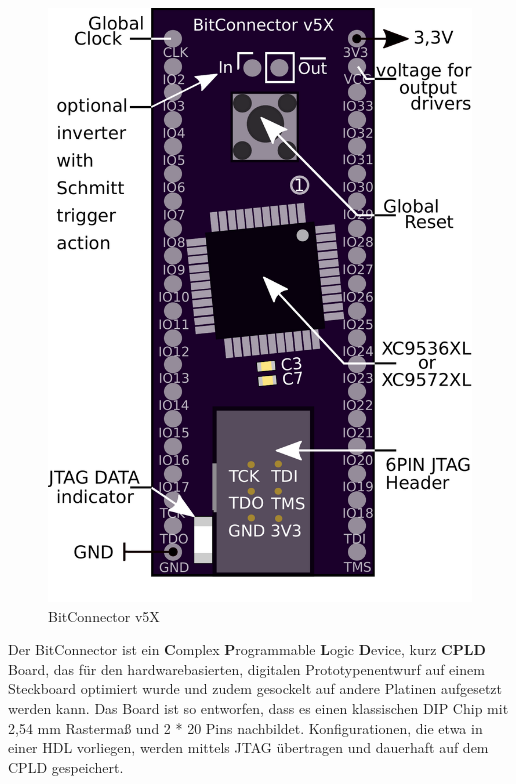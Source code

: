 \documentclass{article}
\begin{document}
\vspace{0.5cm}


\begin{figure}
		\vspace { -15pt }
	\includegraphics[scale=0.3]{BitConnector6P} 
	\caption{BitConnector v5X}
	\label{fig:}
\end{figure}

Der BitConnector ist ein \textbf{C}omplex \textbf{P}rogrammable \textbf{L}ogic \textbf{D}evice, kurz \textbf{CPLD} Board, das für den  hardwarebasierten, digitalen Prototypenentwurf auf einem Steckboard optimiert wurde und zudem gesockelt auf andere Platinen aufgesetzt werden kann. Das Board ist so entworfen, dass es einen klassischen DIP Chip mit 2,54 mm Rastermaß und 2 * 20 Pins nachbildet. Konfigurationen, die etwa in einer HDL vorliegen, werden mittels JTAG übertragen und dauerhaft auf dem CPLD gespeichert.
 
\end{document}
